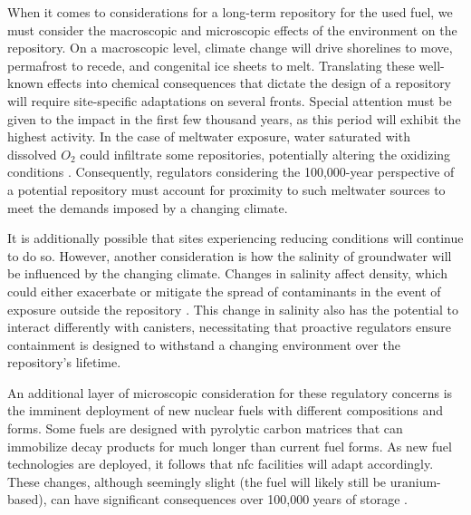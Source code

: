 When it comes to considerations for a long-term repository for the used fuel,
we must consider the macroscopic and microscopic effects of the environment on
the repository. On a macroscopic level, climate change will drive shorelines to
move, permafrost to recede, and congenital ice sheets to melt. Translating
these well-known effects into chemical consequences that dictate the design of
a repository will require site-specific adaptations on several fronts. Special
attention must be given to the impact in the first few thousand years, as this
period will exhibit the highest activity. In the case of meltwater exposure,
water saturated with dissolved $O_2$ could infiltrate some repositories,
potentially altering the oxidizing conditions \cite{gurban_hydrochemical_2001}.
Consequently, regulators considering the 100,000-year perspective of a
potential repository must account for proximity to such meltwater sources to
meet the demands imposed by a changing climate.

It is additionally possible that sites experiencing reducing conditions will
continue to do so. However, another consideration is how the salinity of
groundwater will be influenced by the changing climate. Changes in salinity
affect density, which could either exacerbate or mitigate the spread of
contaminants in the event of exposure outside the repository
\cite{gurban_hydrochemical_2001}. This change in salinity also has the
potential to interact differently with canisters, necessitating that proactive
regulators ensure containment is designed to withstand a changing environment
over the repository's lifetime.

An additional layer of microscopic consideration for these regulatory concerns
is the imminent deployment of new nuclear fuels with different compositions and
forms. Some fuels are designed with pyrolytic carbon matrices that can
immobilize decay products for much longer than current fuel forms. As new fuel
technologies are deployed, it follows that \gls{nfc} facilities will adapt
accordingly. These changes, although seemingly slight (the fuel will likely
still be uranium-based), can have significant consequences over 100,000 years
of storage \cite{hyland_post_closure_2013}.
